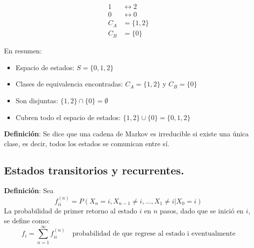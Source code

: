 \documentclass[12pt,a4paper]{article}
\begin{document}
\begin{center}
\end{center}


\begin{align*}
1 &\leftrightarrow 2 \\
0 &\leftrightarrow 0 \\
C_A &= \{1, 2\} \\
C_B &= \{0\}
\end{align*}

En resumen:

\begin{itemize}
    \item Espacio de estados: $S = \{0, 1, 2\}$
    \item Clases de equivalencia encontradas: $C_A = \{1, 2\}$ y $C_B = \{0\}$
    \item Son disjuntas: $\{1, 2\} \cap \{0\} = \emptyset$
    \item Cubren todo el espacio de estados: $\{1, 2\} \cup \{0\} = \{0, 1, 2\}$
\end{itemize}

\textbf{Definición}: Se dice que una cadena de Markov es irreducible si existe una única clase, es decir, todos los estados se comunican entre sí.

\subsection*{Estados transitorios y recurrentes.}

\textbf{Definición}: Sea
\begin{equation*}
f_{ii}^{(n)} = P(X_n=i, X_{n-1} \neq i, \dots, X_1 \neq i | X_0=i)
\end{equation*}
La probabilidad de primer retorno al estado $i$ en $n$ pasos, dado que se inició en $i$, se define como:
\begin{equation*}
f_i = \sum_{n=1}^{\infty} f_{ii}^{(n)} \quad \text{probabilidad de que regrese al estado i eventualmente}
\end{equation*}
\end{document}
